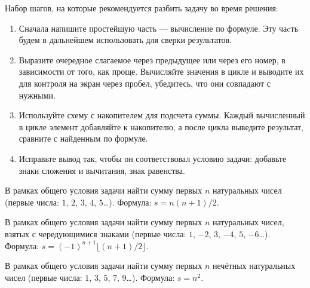 \zzsectionPLAN

Набор шагов, на которые рекомендуется разбить задачу во время решения:
\begin{enumerate}
\item Сначала напишите простейшую часть --- вычисление по формуле. Эту чаcть
будем в дальнейшем использовать для сверки результатов.
%
\item Выразите очередное слагаемое через предыдущее или через его номер,
в зависимости от того, как проще. Вычисляйте значения в цикле и выводите их
для контроля на экран через пробел, убедитесь, что они совпадают с нужными.
%
\item Используйте схему с накопителем для подсчета суммы. Каждый вычисленный
в цикле элемент добавляйте к накопителю, а после цикла выведите результат,
сравните с найденным по формуле.
%
\item Исправьте вывод так, чтобы он соответствовал условию задачи: добавьте
знаки сложения и вычитания, знак равенства.
\end{enumerate}


\zzsectionVARIATIONS


\begin{zztask}
В рамках общего условия задачи найти сумму первых $n$ натуральных чисел
(первые числа: $1$, $2$, $3$, $4$, $5$\dots).
Формула: $s = n(n+1)/2$.
\end{zztask}


\begin{zztask}
В рамках общего условия задачи найти сумму первых $n$ натуральных чисел,
взятых с чередующимися знаками
(первые числа: $1$, $-2$, $3$, $-4$, $5$, $-6$\dots).
Формула: $s = (-1)^{n+1} \lfloor (n+1)/2 \rfloor$.
\end{zztask}


\begin{zztask}
В рамках общего условия задачи найти сумму первых $n$ нечётных натуральных 
чисел (первые числа: $1$, $3$, $5$, $7$, $9$\dots).
Формула: $s = n^2$.
\end{zztask}

